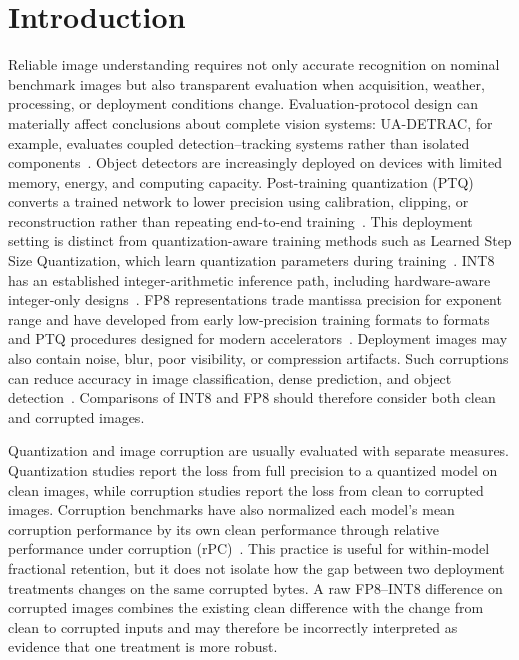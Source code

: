 \documentclass[a4paper,fleqn]{cas-dc}
\begin{document}
\section{Introduction}
\label{sec:introduction}

Reliable image understanding requires not only accurate recognition on nominal benchmark images but also transparent evaluation when acquisition, weather, processing, or deployment conditions change. Evaluation-protocol design can materially affect conclusions about complete vision systems: UA-DETRAC, for example, evaluates coupled detection--tracking systems rather than isolated components~\citep{wen2020uadetrac}. Object detectors are increasingly deployed on devices with limited memory, energy, and computing capacity. Post-training quantization (PTQ) converts a trained network to lower precision using calibration, clipping, or reconstruction rather than repeating end-to-end training~\citep{krishnamoorthi2018whitepaper,jacob2018integer,banner2019post}. This deployment setting is distinct from quantization-aware training methods such as Learned Step Size Quantization, which learn quantization parameters during training~\citep{esser2020lsq}. INT8 has an established integer-arithmetic inference path, including hardware-aware integer-only designs~\citep{jacob2018integer,yao2021hawqv3}. FP8 representations trade mantissa precision for exponent range and have developed from early low-precision training formats to formats and PTQ procedures designed for modern accelerators~\citep{wang2018fp8training,sun2019hfp8,micikevicius2022fp8,shen2024fp8}. Deployment images may also contain noise, blur, poor visibility, or compression artifacts. Such corruptions can reduce accuracy in image classification, dense prediction, and object detection~\citep{hendrycks2019corruptions,kamann2020segrobustness,michaelis2019detectorrobustness,liu2024realworldcorruptions}. Comparisons of INT8 and FP8 should therefore consider both clean and corrupted images.

Quantization and image corruption are usually evaluated with separate measures. Quantization studies report the loss from full precision to a quantized model on clean images, while corruption studies report the loss from clean to corrupted images. Corruption benchmarks have also normalized each model's mean corruption performance by its own clean performance through relative performance under corruption (rPC)~\citep{michaelis2019detectorrobustness}. This practice is useful for within-model fractional retention, but it does not isolate how the gap between two deployment treatments changes on the same corrupted bytes. A raw FP8--INT8 difference on corrupted images combines the existing clean difference with the change from clean to corrupted inputs and may therefore be incorrectly interpreted as evidence that one treatment is more robust.
\end{document}
